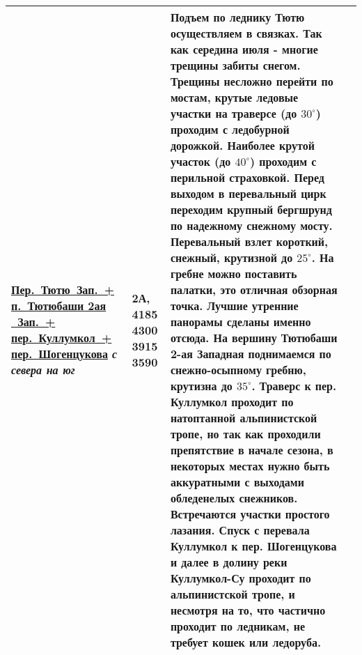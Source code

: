 \begin{longtable}{|>{\centering\arraybackslash}m{4.5cm}|>{\centering\arraybackslash}m{1.8cm}|>{\raggedright\arraybackslash}m{9.6cm}|>{\centering\arraybackslash}m{1.2cm}|}
			\hyperref[subsec:Day17]{{\small Пер.~Тютю~Зап.~+ п.~Тютюбаши 2ая ~Зап.~+ пер.~Куллумкол~+ пер.~Шогенцукова}}	\newline\textit{с севера на юг}			&	2А,	4185 4300 3915 3590		&	{\small Подъем по леднику Тютю осуществляем в связках. Так как середина июля - многие трещины забиты снегом. Трещины несложно перейти по мостам, крутые ледовые участки на траверсе (до $30^\circ$) проходим с ледобурной дорожкой. Наиболее крутой участок (до $40^\circ$) проходим с перильной страховкой. Перед выходом в перевальный цирк переходим крупный бергшрунд по надежному снежному мосту. Перевальный взлет короткий, снежный, крутизной до $25^\circ$. На гребне можно поставить палатки, это отличная обзорная точка. Лучшие утренние панорамы сделаны именно отсюда. На вершину Тютюбаши 2-ая Западная поднимаемся по снежно-осыпному гребню, крутизна до $35^\circ$. Траверс к пер. Куллумкол проходит по натоптанной альпинистской тропе, но так как проходили препятствие в начале сезона, в некоторых местах нужно быть аккуратными с выходами обледенелых снежников. Встречаются участки простого лазания. Спуск с перевала Куллумкол к пер. Шогенцукова и далее в долину реки Куллумкол-Су проходит по альпинистской тропе, и несмотря на то, что частично проходит по ледникам, не требует кошек или ледоруба.}																																																															&			\\ \hline
		\end{longtable}
		

